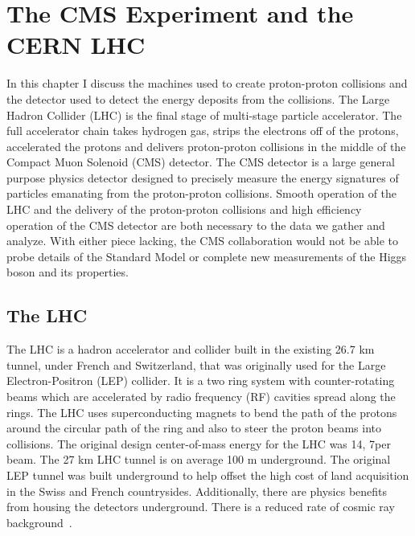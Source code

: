 \chapter{The CMS Experiment and the CERN LHC}
In this chapter I discuss the machines used to create proton-proton collisions and the
detector used to detect the energy deposits from the collisions. The Large Hadron
Collider (LHC) is the final stage of multi-stage particle accelerator. The full
accelerator chain takes hydrogen gas, strips the electrons off of the protons,
accelerated the protons and delivers proton-proton collisions in the middle of the
Compact Muon Solenoid (CMS) detector. The CMS detector is a large general purpose 
physics detector designed to precisely measure the energy signatures of particles
emanating from the proton-proton collisions. Smooth operation of the LHC and the delivery
of the proton-proton collisions and high efficiency operation of the CMS detector
are both necessary to the data we gather and analyze. With either piece lacking,
the CMS collaboration would not be able to probe details of the Standard Model
or complete new measurements of the Higgs boson and its properties.


\section{The LHC}
The LHC is a hadron accelerator and collider built in the existing 26.7 km tunnel,
under French and Switzerland, that was originally used for the Large Electron-Positron (LEP)
collider. It is a two ring system with counter-rotating beams which are accelerated by
radio frequency (RF) cavities spread along the rings. The LHC uses superconducting magnets to 
bend the path of the protons around the circular path of the ring and also to steer
the proton beams into collisions. The original design center-of-mass energy for the LHC
was 14\TeV, 7\TeV per beam. The 27 km LHC tunnel is on average 100 m underground.
The original LEP tunnel was built underground to help offset the high cost of land
acquisition in the Swiss and French countrysides. Additionally, there are physics
benefits from housing the detectors underground. There is a reduced rate of cosmic
ray background~\cite{Voss:2009zz}.

